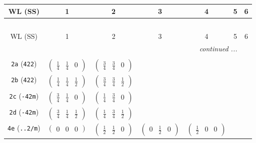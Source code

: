 \documentclass[fleqn,9pt,landscape]{jsarticle}
\begin{document}
\begin{center}
\renewcommand{\arraystretch}{1.2}
\begin{longtable}{ccccccc}
 \hline \hline
WL (SS) & 1 & 2 & 3 & 4 & 5 & 6 \\ \hline \endfirsthead

\multicolumn{6}{l}{\tablename\ \thetable{}} \\
 \hline \hline
WL (SS) & 1 & 2 & 3 & 4 & 5 & 6 \\ \hline \endhead

 \hline \hline
\multicolumn{6}{r}{\footnotesize\it continued ...} \\ \endfoot

 \hline \hline
\multicolumn{6}{r}{} \\ \endlastfoot

{\tt 2a} ({\tt 422}) & $ \begin{pmatrix} \frac{1}{4} & \frac{1}{4} & 0 \end{pmatrix} $ & $ \begin{pmatrix} \frac{3}{4} & \frac{3}{4} & 0 \end{pmatrix} $ & $  $ & $  $ & $  $ & $  $ \\ \hline
{\tt 2b} ({\tt 422}) & $ \begin{pmatrix} \frac{1}{4} & \frac{1}{4} & \frac{1}{2} \end{pmatrix} $ & $ \begin{pmatrix} \frac{3}{4} & \frac{3}{4} & \frac{1}{2} \end{pmatrix} $ & $  $ & $  $ & $  $ & $  $ \\ \hline
{\tt 2c} ({\tt -42m}) & $ \begin{pmatrix} \frac{3}{4} & \frac{1}{4} & 0 \end{pmatrix} $ & $ \begin{pmatrix} \frac{1}{4} & \frac{3}{4} & 0 \end{pmatrix} $ & $  $ & $  $ & $  $ & $  $ \\ \hline
{\tt 2d} ({\tt -42m}) & $ \begin{pmatrix} \frac{3}{4} & \frac{1}{4} & \frac{1}{2} \end{pmatrix} $ & $ \begin{pmatrix} \frac{1}{4} & \frac{3}{4} & \frac{1}{2} \end{pmatrix} $ & $  $ & $  $ & $  $ & $  $ \\ \hline
{\tt 4e} ({\tt ..2/m}) & $ \begin{pmatrix} 0 & 0 & 0 \end{pmatrix} $ & $ \begin{pmatrix} \frac{1}{2} & \frac{1}{2} & 0 \end{pmatrix} $ & $ \begin{pmatrix} 0 & \frac{1}{2} & 0 \end{pmatrix} $ & $ \begin{pmatrix} \frac{1}{2} & 0 & 0 \end{pmatrix} $ & $  $ & $  $ \\ \hline

\end{longtable}
\end{center}
\end{document}
